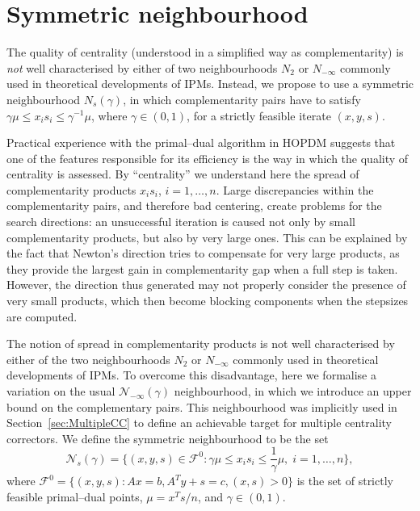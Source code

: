 %
%
\section{Symmetric neighbourhood}
\label{sec:SymNeighbourhood}

The quality of centrality (understood in a simplified way as complementarity)
is {\it not} well characterised by either of two neighbourhoods 
$N_2$ or $N_{-\infty}$ commonly used in theoretical developments of IPMs.
Instead, we propose to use a symmetric neighbourhood $N_s(\gamma)$,
in which complementarity pairs have to satisfy 
$\gamma \mu \leq x_i s_i \leq \gamma^{-1} \mu$, where $\gamma \in (0,1)$, 
for a strictly feasible iterate $(x,y,s)$.


Practical experience with the primal--dual algorithm in HOPDM \cite{HOPDM}
suggests that one of the features responsible 
for its efficiency is the way in which the quality of centrality 
is assessed. By ``centrality'' we understand here the spread 
of complementarity products $x_i s_i$, $i = 1,\dots,n$.
Large discrepancies within the complementarity 
pairs, and therefore bad centering, create problems for the search 
directions: an unsuccessful iteration is caused not only by small
complementarity products, but also by very large ones.
%
 This can be explained by the fact that
Newton's direction tries to compensate for very 
large products, as they provide the largest gain in complementarity 
gap when a full step is taken. However, the direction thus generated 
may not properly consider the presence of very small products, 
which then become blocking components when the stepsizes are computed.

The notion of spread in complementarity products
is not well characterised by either 
of the two neighbourhoods $N_2$ or $N_{-\infty}$ commonly used 
in theoretical developments of IPMs.
To overcome this disadvantage, here we formalise a variation 
on the usual $\mathcal{N}_{-\infty}(\gamma)$ neighbourhood, 
in which we introduce an upper bound on the complementary pairs. 
This neighbourhood was implicitly used in Section~\ref{sec:MultipleCC}
to define an achievable target for multiple centrality correctors.
We define the symmetric neighbourhood to be the set
\[
  \mathcal{N}_s(\gamma)=\{(x,y,s)\in \mathcal{F}^0: 
  \gamma\mu\le x_is_i \le \frac{1}{\gamma}\mu, \; i=1,\ldots,n\},
\]
where $\mathcal{F}^0=\{(x,y,s) : Ax=b,A^Ty+s=c,(x,s)>0\}$ 
is the set of strictly feasible primal--dual points,
$\mu = x^Ts/n$, and $\gamma \in (0,1)$.


